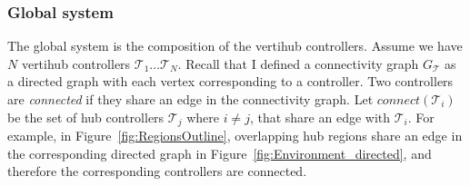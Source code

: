 




\subsubsection{Global system}
The global system is the composition of the vertihub controllers. Assume we have $N$ vertihub controllers $\mathcal{T}_1 \dots \mathcal{T}_N$. Recall that I defined a connectivity graph $G_{\mathcal{T}}$ as a directed graph with each vertex corresponding to a controller. Two controllers are \emph{connected} if they share an edge in the connectivity graph. Let $connect(\mathcal T_i)$ be the set of hub controllers $\mathcal{T}_j$ where $i \neq j$, that share an edge with $\mathcal{T}_i$. For example, in Figure~\ref{fig:RegionsOutline}, overlapping hub regions share an edge in the corresponding directed graph in Figure~\ref{fig:Environment_directed}, and therefore the corresponding controllers are connected. 

